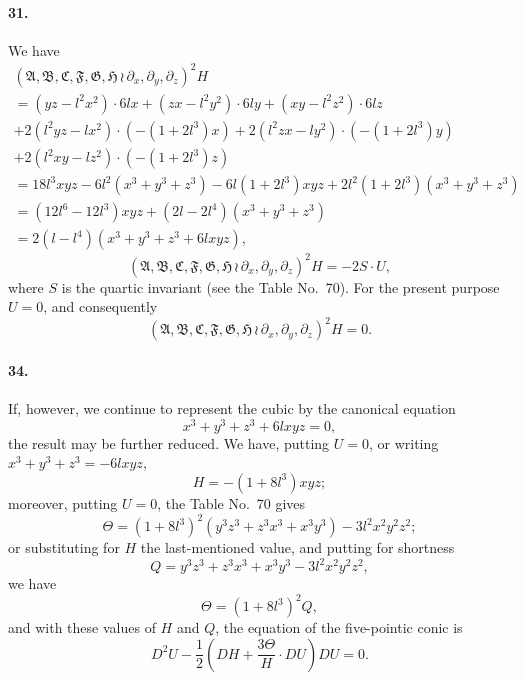 \documentclass[11pt,a4paper]{book}
\begin{document}
\paragraph{31.}
We  have
\begin{multline*}
(\mathfrak{A}, \mathfrak{B}, \mathfrak{C}, \mathfrak{F}, \mathfrak{G}, \mathfrak{H} \,\!\!\wr\, \partial_x, \partial_y, \partial_z)^2 H \\
= (yz - l^2x^2) \cdot 6lx + (zx - l^2y^2) \cdot 6ly + (xy - l^2z^2) \cdot 6lz \\
+ 2(l^2yz - lx^2) \cdot (-(1 + 2l^3)x) + 2(l^2zx - ly^2) \cdot (-(1 + 2l^3)y) \\
+ 2(l^2xy - lz^2) \cdot (-(1 + 2l^3)z) \\
= 18l^3 xyz - 6l^2(x^3 + y^3 + z^3) - 6l(1 + 2l^3)xyz + 2l^2(1 + 2l^3)(x^3 + y^3 + z^3) \\
= (12l^6 - 12l^3)xyz + (2l - 2l^4)(x^3 + y^3 + z^3) \\
= 2(l - l^4)(x^3 + y^3 + z^3 + 6lxyz),
\end{multline*}
\[
(\mathfrak{A}, \mathfrak{B}, \mathfrak{C}, \mathfrak{F}, \mathfrak{G}, \mathfrak{H} \,\!\!\wr\, \partial_x, \partial_y, \partial_z)^2 H = -2S \cdot U,
\]
where   $S$  is  the  quartic  invariant  (see  the  Table  No.~70).     For  the  present  purpose  $U = 0$,
and  consequently
\[
(\mathfrak{A}, \mathfrak{B}, \mathfrak{C}, \mathfrak{F}, \mathfrak{G}, \mathfrak{H} \,\!\!\wr\, \partial_x, \partial_y, \partial_z)^2 H = 0.
\]


\newpage
\paragraph{34.}
If,  however,  we  continue  to  represent  the  cubic  by  the  canonical  equation
\[
x^3 + y^3 + z^3 + 6lxyz = 0,
\]
the  result  may  be  further  reduced.     We  have,  putting  $U = 0$,  or  writing  $x^3 + y^3 + z^3 = -6lxyz$,
\[
H = -(1 + 8l^3) xyz;
\]
moreover,  putting  $U = 0$,  the  Table  No.~70  gives
\[
\Theta = (1 + 8l^3)^2 (y^3 z^3 + z^3 x^3 + x^3 y^3) - 3l^2 x^2 y^2 z^2;
\]
or  substituting  for  $H$  the  last-mentioned  value,  and  putting  for  shortness
\[
Q = y^3 z^3 + z^3 x^3 + x^3 y^3 - 3l^2 x^2 y^2 z^2,
\]
we  have
\[
\Theta = (1 + 8l^3)^2 Q,
\]
and  with  these  values  of  $H$  and  $Q$,  the  equation  of  the  five-pointic  conic  is
\[
D^2 U - \frac{1}{2} \left(DH + \frac{3\Theta}{H} \cdot DU\right) DU = 0.
\]
\end{document}
